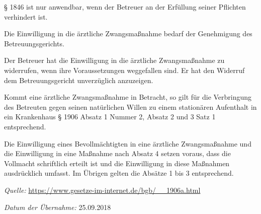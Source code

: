 \begin{legal}
\begin{enumerate}
\end{enumerate}

§ 1846 ist nur anwendbar, wenn der Betreuer an der Erfüllung seiner Pflichten verhindert ist.

\item Die Einwilligung in die ärztliche Zwangsmaßnahme bedarf der Genehmigung des Betreuungsgerichts.

\item Der Betreuer hat die Einwilligung in die ärztliche Zwangsmaßnahme zu widerrufen, wenn ihre Voraussetzungen weggefallen sind. Er hat den Widerruf dem Betreuungsgericht unverzüglich anzuzeigen.

\item Kommt eine ärztliche Zwangsmaßnahme in Betracht, so gilt für die Verbringung des Betreuten gegen seinen natürlichen Willen zu einem stationären Aufenthalt in ein Krankenhaus § 1906 Absatz 1 Nummer 2, Absatz 2 und 3 Satz 1 entsprechend.

\item Die Einwilligung eines Bevollmächtigten in eine ärztliche Zwangsmaßnahme und die Einwilligung in eine Maßnahme nach Absatz 4 setzen voraus, dass die Vollmacht schriftlich erteilt ist und die Einwilligung in diese Maßnahmen ausdrücklich umfasst. Im Übrigen gelten die Absätze 1 bis 3 entsprechend.

\end{legal}

\textit{Quelle:} \url{https://www.gesetze-im-internet.de/bgb/__1906a.html}

\textit{Datum der Übernahme:} 25.09.2018


